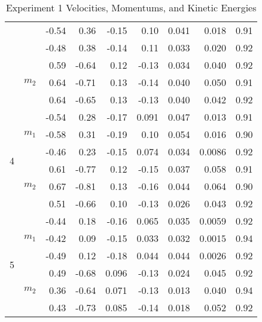 \documentclass [12pt, letterpaper, twoside] {article}
\begin{document}
\begin {table}[h]
\begin {tabular} {| c | c | r | r | r | r | r | r | r |}
    & & -0.54 & 0.36 & -0.15 & 0.10 & 0.041 & 0.018 & 0.91 \\ %
    & & -0.48 & 0.38 & -0.14 & 0.11 & 0.033 & 0.020 & 0.92 \\ %
    \cline{2-9}
    & \multirow {3}{*}{\(m_{2}\)} & 0.59 & -0.64 & 0.12 & -0.13 & 0.034 & 0.040 & 0.92 \\ %
    & & 0.64 & -0.71 & 0.13 & -0.14 & 0.040 & 0.050 & 0.91 \\ %
    & & 0.64 & -0.65 & 0.13 & -0.13 & 0.040 & 0.042 & 0.92 \\ %
    \hline
    \multirow {6}{*}{4} & \multirow {3}{*}{\(m_{1}\)} & -0.54 & 0.28 & -0.17 & 0.091 & 0.047 & 0.013 & 0.91 \\ %
    & & -0.58 & 0.31 & -0.19 & 0.10 & 0.054 & 0.016 & 0.90 \\ %
    & & -0.46 & 0.23 & -0.15 & 0.074 & 0.034 & 0.0086 & 0.92 \\ %
    \cline{2-9}
    & \multirow {3}{*}{\(m_{2}\)} & 0.61 & -0.77 & 0.12 & -0.15 & 0.037 & 0.058 & 0.91 \\ %
    & & 0.67 & -0.81 & 0.13 & -0.16 & 0.044 & 0.064 & 0.90 \\ %
    & & 0.51 & -0.66 & 0.10 & -0.13 & 0.026 & 0.043 & 0.92 \\ %
    \hline
    \multirow {6}{*}{5} & \multirow {3}{*}{\(m_{1}\)} & -0.44 & 0.18 & -0.16 & 0.065 & 0.035 & 0.0059 & 0.92 \\ %
    & & -0.42 & 0.09 & -0.15 & 0.033 & 0.032 & 0.0015 & 0.94 \\ %
    & & -0.49 & 0.12 & -0.18 & 0.044 & 0.044 & 0.0026 & 0.92 \\ %
    \cline{2-9}
    & \multirow {3}{*}{\(m_{2}\)} & 0.49 & -0.68 & 0.096 & -0.13 & 0.024 & 0.045 & 0.92 \\ %
    & & 0.36 & -0.64 & 0.071 & -0.13 & 0.013 & 0.040 & 0.94 \\ %
    & & 0.43 & -0.73 & 0.085 & -0.14 & 0.018 & 0.052 & 0.92 \\ %
    \hline\hline
  \end {tabular}
  \caption {Experiment 1 Velocities, Momentums, and Kinetic Energies}
\end {table}
\end{document}
